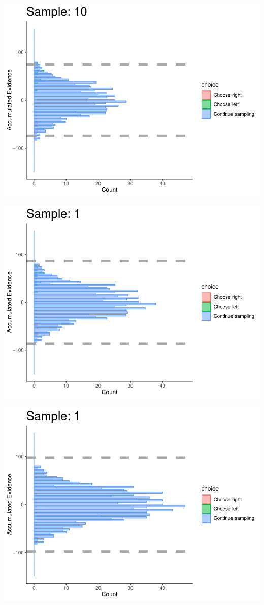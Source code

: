 \documentclass[
]{book}
\begin{document}
\begin{center}\includegraphics[width=0.8\linewidth]{LateNightBayes_files/figure-latex/collapsing_dcb-98} \end{center}

\begin{center}\includegraphics[width=0.8\linewidth]{LateNightBayes_files/figure-latex/collapsing_dcb-99} \end{center}

\begin{center}\includegraphics[width=0.8\linewidth]{LateNightBayes_files/figure-latex/collapsing_dcb-100} \end{center}
\end{document}
